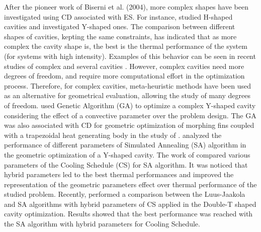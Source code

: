 \documentclass[12pt,fleqn]{article}
\begin{document}
After the pioneer work of Biserni et al. (2004), more complex shapes have been investigated using CD associated with ES. For instance, \cite{Biserni2007} studied H-shaped cavities and \cite{Lorenzini2011} investigated Y-shaped ones. The comparison between different shapes of cavities, kepting the same constraints, has indicated that as more complex the cavity shape is, the best is the thermal performance of the system (for systems with high intensity). Examples of this behavior can be seen in recent studies of complex and several cavities \citep{Xie2010,Lorenzini2012,Lorenzini2014}. However, complex cavities need more degrees of freedom, and require more computational effort in the optimization process. Therefore, for complex cavities, meta-heuristic methods have been used as an alternative for geometrical evaluation, allowing the study of many degrees of freedom. \cite{Lorenzini2014} used Genetic Algorithm (GA) to optimize a complex Y-shaped cavity considering the effect of a convective parameter over the problem design. The GA was also associated with CD for geometric optimization of morphing fins coupled with a trapezoidal heat generating body in the study of \cite{Biserni2017}. \cite{Gonzales2015a} analyzed the performance of different parameters of Simulated Annealing (SA) algorithm in the geometric optimization of a Y-shaped cavity. The work of \cite{Gonzales2015a} compared various parameters of the Cooling Schedule (CS) for SA algorithm. It was noticed that hybrid parameters led to the best thermal performances and improved the representation of the geometric parameters effect over thermal performance of the studied problem. Recently, \cite{Gonzales2017} performed a comparison between the Luus-Jaakola and SA algorithms with hybrid parameters of CS applied in the Double-T shaped cavity optimization. Results showed that the best performance was reached with the SA algorithm with hybrid parameters for Cooling Schedule.
\end{document}
